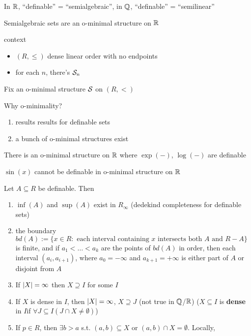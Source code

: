 \documentclass[11pt]{article}
\begin{document}
In \(\mathbb{R}\), ``definable'' = ``semialgebraic'', in \(\mathbb{Q}\), ``definable'' = ``semilinear''

\begin{fact}[]
Semialgebraic sets are an o-minimal structure on \(\mathbb{R}\)
\end{fact}

context
\begin{itemize}
\item \((R,\le)\) dense linear order with no endpoints
\item for each \(n\), there's \(\mathcal{S}_n\)
\end{itemize}

Fix an o-minimal structure \(\mathcal{S}\) on \((R,<)\)

Why o-minimality?
\begin{enumerate}
\item results results for definable sets
\item a bunch of o-minimal structures exist
\end{enumerate}

\begin{fact}[Wilkie]
There is an o-minimal structure on \(\mathbb{R}\) where \(\exp(-)\), \(\log(-)\) are definable
\end{fact}

\(\sin(x)\) cannot be definable in o-minimal structure on \(\mathbb{R}\)

\begin{lemma}[]
Let \(A\subseteq R\) be definable. Then
\begin{enumerate}
\item \(\inf(A)\) and \(\sup(A)\) exist in \(R_\infty\) (dedekind completeness for definable sets)
\item the
boundary \(bd(A):=\{x\in R:\text{ each interval containing $x$ intersects both $A$ and $R-A$}\}\)
is finite, and if \(a_1<\dots<a_k\) are the points of \(bd(A)\) in order, then each
interval \((a_i,a_{i+1})\), where \(a_0=-\infty\) and \(a_{k+1}=+\infty\) is either part of \(A\) or
disjoint from \(A\)
\item If \(\abs{X}=\infty\) then \(X\supseteq I\) for some \(I\)
\item If \(X\) is dense in \(I\), then \(\abs{X}=\infty\), \(X\supseteq J\) (not true in \(\mathbb{Q}\)/\(\mathbb{R}\)) (\(X\subseteq I\) is
\textbf{dense} in \(I\)if \(\forall J\subseteq I(J\cap X\neq\emptyset)\))
\item If \(p\in R\), then \(\exists b>a\) s.t. \((a,b)\subseteq X\) or \((a,b)\cap X=\emptyset\). Locally,
\end{enumerate}
\end{lemma}
\end{document}
